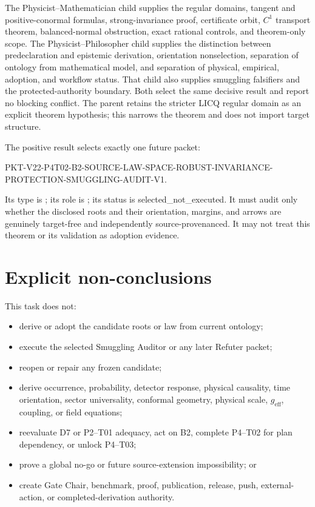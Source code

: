 \documentclass[11pt]{article}
\newcommand{\status}[1]{\textsf{#1}}
\begin{document}
The Physicist--Mathematician child supplies the regular domains, tangent and
positive-conormal formulas, strong-invariance proof, certificate orbit,
\(C^1\) transport theorem, balanced-normal obstruction, exact rational
controls, and theorem-only scope.  The Physicist--Philosopher child supplies
the distinction between predeclaration and epistemic derivation, orientation
nonselection, separation of ontology from mathematical model, and separation
of physical, empirical, adoption, and workflow status.  That child also
supplies smuggling falsifiers and the protected-authority boundary.  Both
select the same decisive
result and report no blocking conflict.  The parent retains the stricter LICQ
regular domain as an explicit theorem hypothesis; this narrows the theorem and
does not import target structure.

The positive result selects exactly one future packet:
\begin{flushleft}
\small\ttfamily
PKT-V22-P4T02-B2-SOURCE-LAW-SPACE-ROBUST-INVARIANCE-\\
PROTECTION-SMUGGLING-AUDIT-V1.
\end{flushleft}
Its type is ; its role is
; its status is
\status{selected\_not\_executed}.  It must audit only whether the disclosed
roots and their orientation, margins, and arrows are genuinely target-free
and independently source-provenanced.  It may not treat this theorem or its
validation as adoption evidence.

\section{Explicit non-conclusions}

This task does not:
\begin{itemize}
  \item derive or adopt the candidate roots or law from current ontology;
  \item execute the selected Smuggling Auditor or any later Refuter packet;
  \item reopen or repair any frozen candidate;
  \item derive occurrence, probability, detector response, physical
  causality, time orientation, sector universality, conformal geometry,
  physical scale, \(g_{\mathrm{eff}}\), coupling, or field equations;
  \item reevaluate D7 or P2--T01 adequacy, act on B2, complete P4--T02 for
  plan dependency, or unlock P4--T03;
  \item prove a global no-go or future source-extension impossibility; or
  \item create Gate Chair, benchmark, proof, publication, release, push,
  external-action, or completed-derivation authority.
\end{itemize}
\end{document}
